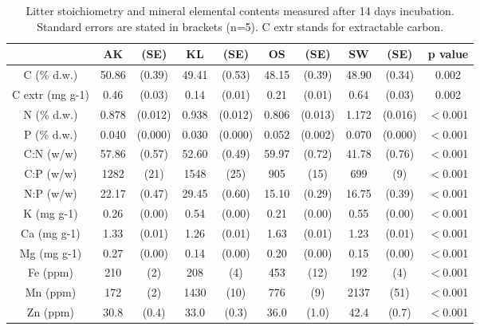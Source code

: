 \documentclass[10pt]{article}
\begin{document}
\newpage
\begin{table}[h!]
\begin{center}
\caption{Litter stoichiometry and mineral elemental contents measured after 14 days incubation. Standard errors are stated in brackets (n=5). C extr stands for extractable carbon.}
\label{initstoech}
{\tiny
\begin{tabular}{cccccccccc}
  \hline
 & AK & (SE) & KL & (SE) & OS & (SE) & SW & (SE) & p value \\ 
  \hline
C (\% d.w.) & 50.86 & (0.39) & 49.41 & (0.53) & 48.15 & (0.39) & 48.90 & (0.34) & 0.002 \\ 
  C extr (mg g-1) & 0.46 & (0.03) & 0.14 & (0.01) & 0.21 & (0.01) & 0.64 & (0.03) & 0.002 \\ 
  N (\% d.w.) & 0.878 &  (0.012) & 0.938 &  (0.012) & 0.806 &  (0.013) & 1.172 &  (0.016) & $<$0.001 \\ 
  P (\% d.w.) & 0.040 & (0.000) & 0.030 & (0.000) & 0.052 & (0.002) & 0.070 & (0.000) & $<$0.001 \\ 
  C:N (w/w) & 57.86 &  (0.57) & 52.60 &  (0.49) & 59.97 &  (0.72) & 41.78 &  (0.76) & $<$0.001 \\ 
  C:P (w/w) & 1282 & (21) & 1548 & (25) & 905 & (15) & 699 & (9) & $<$0.001 \\ 
  N:P (w/w) & 22.17 & (0.47) & 29.45 & (0.60) & 15.10 & (0.29) & 16.75 & (0.39) & $<$0.001 \\ 
  K (mg g-1) & 0.26 & (0.00) & 0.54 & (0.00) & 0.21 & (0.00) & 0.55 & (0.00) & $<$0.001 \\ 
  Ca (mg g-1) & 1.33 & (0.01) & 1.26 & (0.01) & 1.63 & (0.01) & 1.23 & (0.01) & $<$0.001 \\ 
  Mg (mg g-1) & 0.27 &  (0.00) & 0.14 &  (0.00) & 0.20 &  (0.00) & 0.15 &  (0.00) & $<$0.001 \\ 
  Fe (ppm) & 210 & (2) & 208 & (4) & 453 & (12) & 192 & (4) & $<$0.001 \\ 
  Mn (ppm) & 172 &  (2) & 1430 &  (10) & 776 &  (9) & 2137 &  (51) & $<$0.001 \\ 
  Zn (ppm) & 30.8 & (0.4) & 33.0 & (0.3) & 36.0 & (1.0) & 42.4 & (0.7) & $<$0.001 \\ 
   \hline
\end{tabular}
}
\end{center}
\end{table}
\newpage
\end{document}
